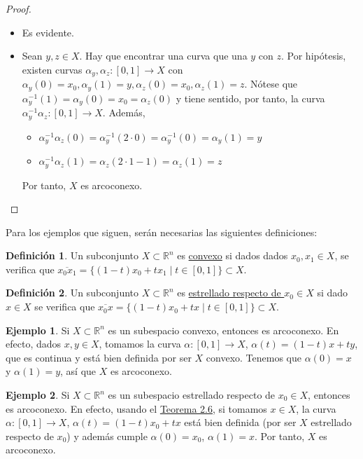 \documentclass[12pt]{report}
\theoremstyle{definition}
\newtheorem{definition}{Definición}[chapter]
\theoremstyle{definition}
\newtheorem{example}{Ejemplo}[chapter]
\theoremstyle{remark}
\newcommand{\R}{\mathbb R}
\begin{document}
\begin{proof}
\hfill
\begin{itemize}
    \item[{\fbox[rb]{$\Rightarrow$}}] Es evidente.
    \item[{\fbox[rb]{$\Leftarrow$}}] Sean $y,z \in X$. Hay que encontrar una curva que una $y$ con $z$. Por hipótesis, existen curvas $\alpha_y, \alpha_z \colon [0,1] \to X$ con $\alpha_y(0) = x_0, \alpha_y(1) = y, \alpha_z(0) = x_0, \alpha_z(1) = z$. Nótese que $\alpha_y^{-1}(1) = \alpha_y(0) = x_0 = \alpha_z(0)$ y tiene sentido, por tanto, la curva $\alpha_y^{-1}\alpha_z \colon [0,1] \to X$. Además, 
    \begin{itemize}
        \item $\alpha_y^{-1}\alpha_z(0) = \alpha_y^{-1}(2 \cdot 0) = \alpha_y^{-1}(0) = \alpha_y(1) = y$
        \item $\alpha_y^{-1}\alpha_z(1) = \alpha_z(2 \cdot 1 - 1) = \alpha_z(1) = z$
    \end{itemize}
    Por tanto, $X$ es arcoconexo.
\end{itemize}
\end{proof}

\vspace{2mm}
Para los ejemplos que siguen, serán necesarias las siguientes definiciones:

\begin{definition}
Un subconjunto $X \subset \R^n$ es \underline{convexo} si dados dados $x_0,x_1 \in X$, se verifica que $\overline{x_0x_1} = \{(1-t)x_0 + tx_1 \mid t \in [0,1]\} \subset X$.
\end{definition}

\begin{definition}
Un subconjunto $X \subset \R^n$ es \underline{estrellado respecto de $x_0 \in X$} si dado $x \in X$ se verifica que $\overline{x_0x} = \{(1-t)x_0 + tx \mid t \in [0,1]\} \subset X$.
\end{definition}

\vspace{2mm}
\begin{example}
Si $X \subset \R^n$ es un subespacio convexo, entonces es arcoconexo. En efecto, dados $x,y \in X$, tomamos la curva $\alpha \colon [0,1] \to X$, $\alpha(t) = (1-t)x + ty$, que es continua y está bien definida por ser $X$ convexo. Tenemos que $\alpha(0) = x$ y $\alpha(1) = y$, así que $X$ es arcoconexo.
\end{example}

\begin{example}
Si $X \subset \R^n$ es un subespacio estrellado respecto de $x_0 \in X$, entonces es arcoconexo. En efecto, usando el \hyperref[teo2.6.]{\color{blue}Teorema 2.6}, si tomamos $x \in X$, la curva $\alpha \colon [0,1] \to X$, $\alpha(t) = (1-t)x_0 + tx$ está bien definida (por ser $X$ estrellado respecto de $x_0$) y además cumple $\alpha(0) = x_0$, $\alpha(1) = x$. Por tanto, $X$ es arcoconexo.
\end{example}
\end{document}
